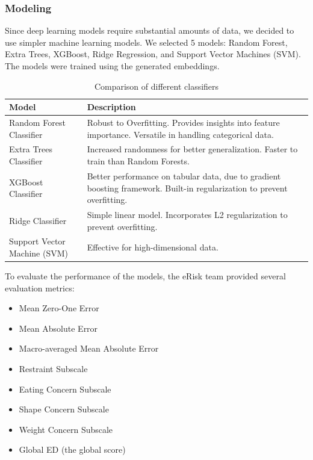 \documentclass[]{style/ceurart}
\begin{document}
\subsubsection{Modeling}

Since deep learning models require substantial amounts of data, we decided to use simpler machine learning models. We selected 5 models: Random Forest, Extra Trees, XGBoost, Ridge Regression, and Support Vector Machines (SVM). The models were trained using the generated embeddings.

\begin{table}[h]
\centering
\caption{Comparison of different classifiers}
\renewcommand{\arraystretch}{1.2}
\begin{tabular}{@{}lp{10cm}@{}}
\toprule
\textbf{Model} & \textbf{Description} \\ \midrule
Random Forest Classifier & Robust to Overfitting. Provides insights into feature importance. Versatile in handling categorical data. \\ \midrule
Extra Trees Classifier & Increased randomness for better generalization. Faster to train than Random Forests. \\ \midrule
XGBoost Classifier & Better performance on tabular data, due to gradient boosting framework. Built-in regularization to prevent overfitting. \\ \midrule
Ridge Classifier & Simple linear model. Incorporates L2 regularization to prevent overfitting. \\ \midrule
Support Vector Machine (SVM) & Effective for high-dimensional data. \\ \bottomrule
\end{tabular}
\end{table}

To evaluate the performance of the models, the eRisk team provided several evaluation metrics:
\begin{itemize}
    \item Mean Zero-One Error
    \item Mean Absolute Error
    \item Macro-averaged Mean Absolute Error
    \item Restraint Subscale
    \item Eating Concern Subscale
    \item Shape Concern Subscale
    \item Weight Concern Subscale
    \item Global ED (the global score)
\end{itemize}
\end{document}
